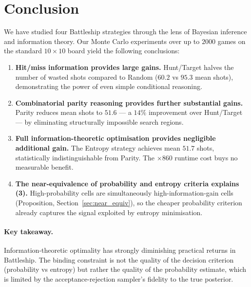\documentclass[12pt,a4paper]{article}
\newcommand{\1}{\mathbf{1}}
\begin{document}
\section{Conclusion}

We have studied four Battleship strategies through the lens of Bayesian inference
and information theory.  Our Monte Carlo experiments over up to $2000$ games on
the standard $10\times10$ board yield the following conclusions:

\begin{enumerate}[nosep]
  \item \textbf{Hit/miss information provides large gains.}  Hunt/Target halves
        the number of wasted shots compared to Random ($60.2$ vs $95.3$ mean
        shots), demonstrating the power of even simple conditional reasoning.

  \item \textbf{Combinatorial parity reasoning provides further substantial
        gains.}  Parity reduces mean shots to $51.6$ --- a $14\%$ improvement
        over Hunt/Target --- by eliminating structurally impossible search
        regions.

  \item \textbf{Full information-theoretic optimisation provides negligible
        additional gain.}  The Entropy strategy achieves mean $51.7$ shots,
        statistically indistinguishable from Parity.  The $\times 860$ runtime
        cost buys no measurable benefit.

  \item \textbf{The near-equivalence of probability and entropy criteria explains
        (3).}  High-probability cells are simultaneously high-information-gain
        cells (Proposition, Section~\ref{sec:near_equiv}), so the cheaper
        probability criterion already captures the signal exploited by entropy
        minimisation.
\end{enumerate}

\paragraph{Key takeaway.}
Information-theoretic optimality has strongly diminishing practical returns
in Battleship.  The binding constraint is not the quality of the decision
criterion (probability vs entropy) but rather the quality of the probability
estimate, which is limited by the acceptance-rejection sampler's fidelity to the
true posterior.
\end{document}
